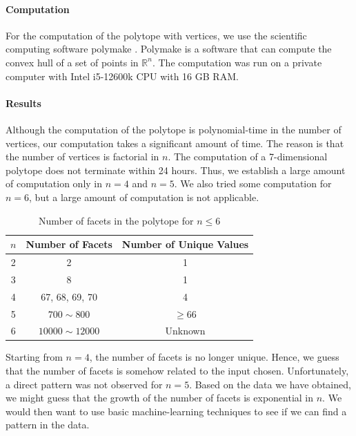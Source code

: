 \documentclass[12pt,letterpaper]{article}
\newcommand*{\R}{\mathbb{R}}
\begin{document}
\paragraph{Computation}
For the computation of the polytope with vertices, we use the scientific computing software polymake \cite{assarf2017computing}.
Polymake is a software that can compute the convex hull of a set of points in $\R^n$. 
The computation was run on a private computer with Intel i5-12600k CPU with 16 GB RAM. 

\paragraph{Results}
Although the computation of the polytope is polynomial-time in the number of vertices, our computation takes 
a significant amount of time. The reason is that the number of vertices is factorial in $n$. 
The computation of a 7-dimensional polytope does not terminate within 24 hours. Thus, we establish a large amount of 
computation only in $n = 4$ and $n = 5$. We also tried some computation for $n = 6$, but a large amount of computation 
is not applicable. 
\begin{table}[ht]
    \centering
    \begin{tabular}{||c | c | c ||}
        \hline 
        $n$ & Number of Facets & Number of Unique Values\\
        \hline 
        \hline 
 2 & 2 & 1\\
        \hline 
 3 & 8 & 1\\
        \hline 
 4 & 67, 68, 69, 70 & 4\\
        \hline 
 5 & $700 \sim 800$ & $\geq 66$\\
        \hline 
 6 & $10000 \sim 12000$  & Unknown\\
        \hline 
    \end{tabular}
    \caption{Number of facets in the polytope for $n \leq 6$}
\end{table}
Starting from $n = 4$, the number of facets is no longer unique. 
Hence, we guess that the number of facets is somehow related to the input chosen. 
Unfortunately, a direct pattern was not observed for $n=5$. 
Based on the data we have obtained, we might guess that the growth of the number of facets is exponential in $n$. 
We would then want to use basic machine-learning techniques to see if we can find a pattern in the data.
\end{document}

